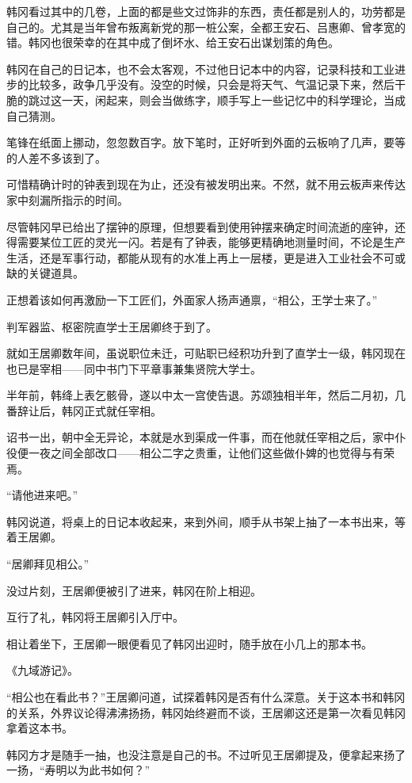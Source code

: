韩冈看过其中的几卷，上面的都是些文过饰非的东西，责任都是别人的，功劳都是自己的。尤其是当年曾布叛离新党的那一桩公案，全都王安石、吕惠卿、曾孝宽的错。韩冈也很荣幸的在其中成了倒坏水、给王安石出谋划策的角色。

韩冈在自己的日记本，也不会太客观，不过他日记本中的内容，记录科技和工业进步的比较多，政争几乎没有。没空的时候，只会是将天气、气温记录下来，然后干脆的跳过这一天，闲起来，则会当做练字，顺手写上一些记忆中的科学理论，当成自己猜测。

笔锋在纸面上挪动，忽忽数百字。放下笔时，正好听到外面的云板响了几声，要等的人差不多该到了。

可惜精确计时的钟表到现在为止，还没有被发明出来。不然，就不用云板声来传达家中刻漏所指示的时间。

尽管韩冈早已给出了摆钟的原理，但想要看到使用钟摆来确定时间流逝的座钟，还得需要某位工匠的灵光一闪。若是有了钟表，能够更精确地测量时间，不论是生产生活，还是军事行动，都能从现有的水准上再上一层楼，更是进入工业社会不可或缺的关键道具。

正想着该如何再激励一下工匠们，外面家人扬声通禀，“相公，王学士来了。”

判军器监、枢密院直学士王居卿终于到了。

就如王居卿数年间，虽说职位未迁，可贴职已经积功升到了直学士一级，韩冈现在也已是宰相——同中书门下平章事兼集贤院大学士。

半年前，韩绛上表乞骸骨，遂以中太一宫使告退。苏颂独相半年，然后二月初，几番辞让后，韩冈正式就任宰相。

诏书一出，朝中全无异论，本就是水到渠成一件事，而在他就任宰相之后，家中仆役便一夜之间全部改口——相公二字之贵重，让他们这些做仆婢的也觉得与有荣焉。

“请他进来吧。”

韩冈说道，将桌上的日记本收起来，来到外间，顺手从书架上抽了一本书出来，等着王居卿。

“居卿拜见相公。”

没过片刻，王居卿便被引了进来，韩冈在阶上相迎。

互行了礼，韩冈将王居卿引入厅中。

相让着坐下，王居卿一眼便看见了韩冈出迎时，随手放在小几上的那本书。

《九域游记》。

“相公也在看此书？”王居卿问道，试探着韩冈是否有什么深意。关于这本书和韩冈的关系，外界议论得沸沸扬扬，韩冈始终避而不谈，王居卿这还是第一次看见韩冈拿着这本书。

韩冈方才是随手一抽，也没注意是自己的书。不过听见王居卿提及，便拿起来扬了一扬，“寿明以为此书如何？”

